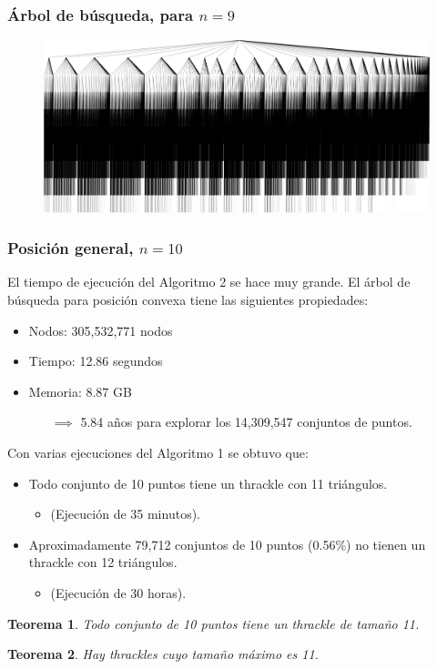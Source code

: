 \documentclass{beamer}
\newtheorem{teo}{Teorema}
\begin{document}
\begin{frame}
  \frametitle{Árbol de búsqueda, para $n=9$}
  \begin{figure}[htb]
    \includegraphics[width=\textwidth]{n_9_thr_full.png}
  \end{figure}
\end{frame}

\begin{frame}
  \frametitle{Posición general, $n=10$}
  El tiempo de ejecución del Algoritmo 2 se hace muy grande. El árbol de
  búsqueda para posición convexa tiene las siguientes propiedades:
  \begin{itemize}
    \item Nodos: 305,532,771 nodos
    \item Tiempo: 12.86 segundos
    \item Memoria: 8.87 GB
      \begin{itemize}[leftmargin=1.5cm]
        \item[$\implies$] 5.84 años para explorar los 14,309,547 conjuntos de puntos.
      \end{itemize}
  \end{itemize}
  \begin{overprint}
    Con varias ejecuciones del Algoritmo 1 se obtuvo que:
    \begin{itemize}
      \item Todo conjunto de 10 puntos tiene un thrackle con 11 triángulos.
        \begin{itemize}[leftmargin=1cm]
          \item (Ejecución de 35 minutos).
        \end{itemize}
      \item Aproximadamente 79,712 conjuntos de 10 puntos (0.56\%) no tienen un
        thrackle con 12 triángulos.
        \begin{itemize}[leftmargin=1cm]
          \item (Ejecución de 30 horas).
        \end{itemize}
    \end{itemize}
    \begin{teo}
      Todo conjunto de 10 puntos tiene un thrackle de tamaño 11.
    \end{teo}
    \vspace{0.5cm}
    \begin{teo}
      Hay thrackles cuyo tamaño máximo es 11.
    \end{teo}
  \end{overprint}
\end{frame}
\end{document}
